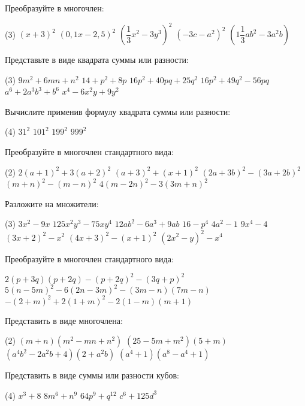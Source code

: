 \begin{class}[number=5]
	\begin{listofex}
	\item Преобразуйте в многочлен:
	\begin{tasks}(3)
		\task \( (x+3)^2 \)
		\task \( (0,1x-2,5)^2 \)
		\task \( \left( \dfrac{1}{3}x^2-3y^3 \right)^2 \)
		\task \( (-3c-a^2)^2 \)
		\task \( \left( 1\dfrac{1}{3}ab^2-3a^2b \right) \)
	\end{tasks}
	\item Представьте в виде квадрата суммы или разности:
	\begin{tasks}(3)
		\task \( 9m^2+6mn+n^2 \)
		\task \( 14+p^2+8p \)
		\task \( 16p^2+40pq+25q^2 \)
		\task \( 16p^2+49q^2-56pq \)
		\task \( a^6+2a^3b^3+b^6 \)
		\task \( x^4-6x^2y+9y^2 \)
	\end{tasks}
	\item Вычислите применив формулу квадрата суммы или разности:
	\begin{tasks}(4)
		\task \( 31^2 \)
		\task \( 101^2 \)
		\task \( 199^2 \)
		\task \( 999^2 \)
	\end{tasks}
	\item Преобразуйте в многочлен стандартного вида:
	\begin{tasks}(2)
		\task \( 2(a+1)^2 +3(a+2)^2\)
		\task \( (a+3)^2+(x+1)^2\)
		\task \( (2a+3b)^2-(3a+2b)^2 \)
		\task \( (m+n)^2-(m-n)^2 \)
		\task \( 4(m-2n)^2-3(3m+n)^2 \)
	\end{tasks}
	\item Разложите на множители:
	\begin{tasks}(3)
		\task \( 3x^2-9x \)
		\task \( 125x^2y^3-75xy^4 \)
		\task \( 12ab^2-6a^3+9ab \)
		\task \( 16-p^4 \)
		\task \( 4a^2-1 \)
		\task \( 9x^4-4 \)
		\task \( (3x+2)^2-x^2 \)
		\task \( (4x+3)^2-(x+1)^2 \)
		\task \( (2x^2-y)^2-x^4 \)
	\end{tasks}
	\item Преобразуйте в многочлен стандартного вида:
	\begin{tasks} 
		\task \( 2(p+3q)(p+2q)-(p+2q)^2-(3q+p)^2 \)
		\task \( 5(n-5m)^2-6(2n-3m)^2-(3m-n)(7m-n) \)
		\task \( -(2+m)^2+2(1+m)^2-2(1-m)(m+1) \)
	\end{tasks}
	\item Представить в виде многочлена:
	\begin{tasks}(2)
		\task \( (m+n)(m^2-mn+n^2) \)
		\task \( (25-5m+m^2)(5+m) \)
		\task \( (a^4b^2-2a^2b+4)(2+a^2b) \)
		\task \( (a^4+1)(a^8-a^4+1) \)
	\end{tasks}
	\item Представить в виде суммы или разности кубов:
	\begin{tasks}(4)
		\task \( x^3+8 \)
		\task \( 8m^6+n^9 \)
		\task \( 64p^9+q^{12} \)
		\task \( c^6+125d^3 \)
	\end{tasks}
	\end{listofex}
\end{class}

